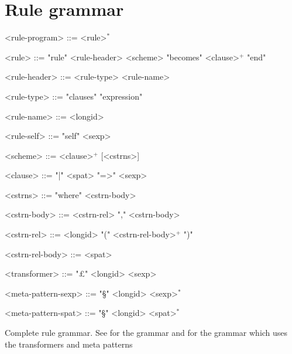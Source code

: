 \clearpage

\section{Rule grammar}

\begin{nonfloatingtable}

  \setlength{\grammarindent}{7.3em}
  \begin{grammar} 
    
    <rule-program> ::= <rule>$^{*}$
    
    <rule> ::= "rule" <rule-header> <scheme> "becomes" <clause>$^{+}$ "end"
    
    <rule-header> ::= <rule-type> <rule-name>
    
    <rule-type> ::= "clauses" 
    \alt "expression" 
    
    <rule-name> ::= <longid>
    
    <rule-self> ::= "self" <sexp>
    
    <scheme> ::= <clause>$^{+}$ [<cstrns>]
    
    <clause> ::= "|" <spat> "=>" <sexp>
    
    <cstrns> ::= "where" <cstrn-body> 
    
    <cstrn-body> ::= <cstrn-rel> 
     "," <cstrn-body>
    
    <cstrn-rel> ::= <longid> "(" <cstrn-rel-body>$^{+}$ ")"
    
    <cstrn-rel-body> ::= <spat>   
    
    <transformer> ::= "£" <longid> <sexp>

    <meta-pattern-sexp> ::= "§" <longid>  <sexp>$^{*}$
    
    <meta-pattern-spat> ::= "§" <longid>  <spat>$^{*}$

  \end{grammar}
  
  \caption{Complete rule grammar. See  for the
     grammar and  for the 
    grammar which uses the transformers and meta patterns}
  \label{tab:rule-grammar}

\end{nonfloatingtable} 


